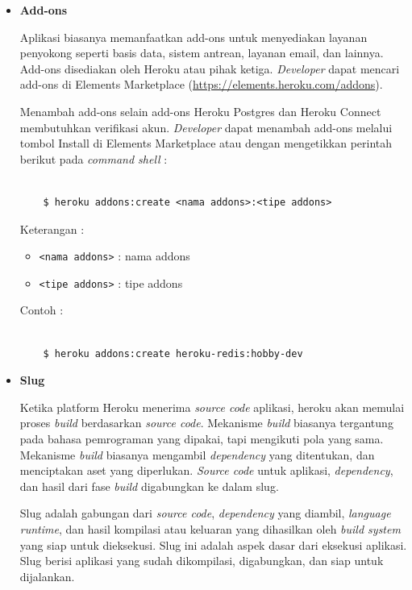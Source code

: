 \documentclass[a4paper,twoside]{article}
\begin{document}
\begin{enumerate}
\begin{enumerate}
\begin{itemize}
				\item \textbf{Add-ons}
		
				Aplikasi biasanya memanfaatkan add-ons untuk menyediakan layanan penyokong seperti basis data, sistem antrean, layanan email, dan lainnya. Add-ons disediakan oleh Heroku atau pihak ketiga. \textit{Developer} dapat mencari add-ons di Elements Marketplace (\url{https://elements.heroku.com/addons}). 

Menambah add-ons selain add-ons Heroku Postgres dan Heroku Connect membutuhkan verifikasi akun. \textit{Developer} dapat menambah add-ons melalui tombol Install di Elements Marketplace atau dengan mengetikkan perintah berikut pada \textit{command shell} :
\begin{lstlisting}

	$ heroku addons:create <nama addons>:<tipe addons>

\end{lstlisting}
Keterangan :
\begin{itemize}
\item \texttt{<nama addons>} : nama addons
\item \texttt{<tipe addons>} : tipe addons
\end{itemize}

Contoh :
\begin{lstlisting}

	$ heroku addons:create heroku-redis:hobby-dev

\end{lstlisting}

				\item \textbf{Slug}
		
				Ketika platform Heroku menerima \textit{source code} aplikasi, heroku akan memulai proses \textit{build} berdasarkan \textit{source code}. Mekanisme \textit{build} biasanya tergantung pada bahasa pemrograman yang dipakai, tapi mengikuti pola yang sama. Mekanisme \textit{build} biasanya mengambil \textit{dependency} yang ditentukan, dan menciptakan aset yang diperlukan. \textit{Source code} untuk aplikasi, \textit{dependency}, dan hasil dari fase \textit{build} digabungkan ke dalam slug. 

Slug adalah gabungan dari \textit{source code}, \textit{dependency} yang diambil, \textit{language runtime}, dan hasil kompilasi atau keluaran yang dihasilkan oleh \textit{build system} yang siap untuk dieksekusi. Slug ini adalah aspek dasar dari eksekusi aplikasi. Slug berisi aplikasi yang sudah dikompilasi, digabungkan, dan siap untuk dijalankan.


\end{itemize}
\end{enumerate}
\end{enumerate}
\end{document}
